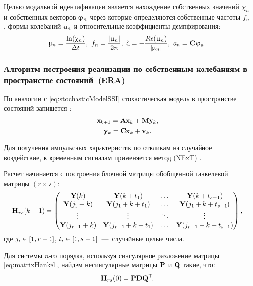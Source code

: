 Целью модальной идентификации является нахождение собственных значений $ \chi_n $ и собственных векторов $ \mathbf{\upvarphi}_n $ через которые определяются собственные частоты $ f_n $, формы колебаний $ \mathbf{a}_n $ и относительные коэффициенты демпфирования:
\begin{equation}
	\upmu_n = \frac{\ln(\upchi_n)}{\Delta t}, \ f_n = \frac{|\upmu_n|}{2 \uppi}, \ \upzeta = -\frac{Re(\upmu_n)}{|\upmu_n|}, \ a_n = \mathbf{C} \mathbf{\upvarphi}_n.
\end{equation}

\subsubsection{Алгоритм построения реализации по собственным колебаниям в пространстве состояний~(ERA)}

По аналогии с \eqref{eq:stochasticModelSSI} стохастическая модель в пространстве состояний запишется \cite{lib:oma:Juang}:
\begin{gather}
	\mathbf{x}_{k + 1} = \mathbf{A} \mathbf{x}_k + \mathbf{M} \mathbf{y}_k, \\
	\mathbf{y}_k = \mathbf{C} \mathbf{x}_k + \mathbf{v}_k.
\end{gather}

Для получения импульсных характеристик по откликам на случайное воздействие, к временным сигналам применяется метод  (NExT) \cite{lib:oma:Lin}. 

Расчет начинается с построения блочной матрицы обобщенной ганкелевой матрицы $ (r \times s) $:
\begin{equation}
	\mathbf{H}_{rs}(k - 1) = 
	\begin{pmatrix}
		\mathbf{Y}(k) & \mathbf{Y}(k + t_1) & \dots & \mathbf{Y}(k + t_{s - 1}) \\
		\mathbf{Y}(j_1 + k) & \mathbf{Y}(j_1 + k + t_1) & \dots & \mathbf{Y}(j_1 + k + t_{s - 1}) \\
		\vdots & \vdots & \ddots & \vdots \\
		\mathbf{Y}(j_{r - 1} + k) & \mathbf{Y}(j_{r - 1} + k + t_1) & \dots & \mathbf{Y}(j_{r - 1} + k + t_{s - 1})
	\end{pmatrix}, \label{eq:matrixHankel}
\end{equation}
где $j_i \in \left[ 1, r - 1 \right] $, $ t_i \in \left[ 1, s - 1 \right]$~---~случайные целые числа.

Для системы $ n $-го порядка, используя сингулярное разложение матрицы \eqref{eq:matrixHankel}, найдем несингулярные матрицы $ \mathbf{P} $ и $ \mathbf{Q} $ такие, что:
\begin{equation}
	\mathbf{H}_{rs}(0) = \mathbf{P} \mathbf{D} \mathbf{Q} ^ \mathsf{T}.
\end{equation}


